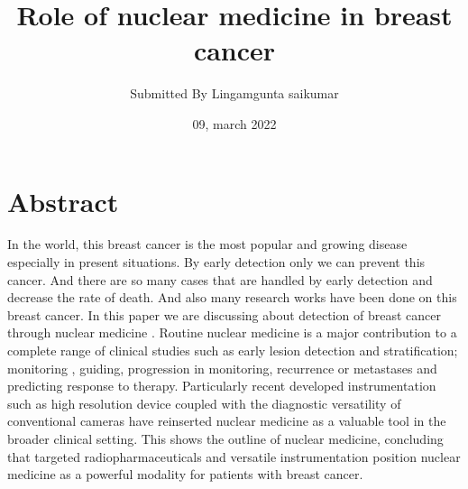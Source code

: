 \documentclass{article}
\title{Role of nuclear medicine in breast cancer}
\author{Submitted By Lingamgunta saikumar}
\date{09, march 2022}
\begin{document}
\maketitle
\section{Abstract}
In the world, this breast cancer is the most popular and growing disease especially in 
present situations. By early detection only we can prevent this cancer. And there are so 
many cases that are handled by early detection and decrease the rate of death. And also 
many research works have been done on this breast cancer. In this paper we are discussing 
about detection of breast cancer through nuclear medicine . Routine nuclear medicine is a 
major contribution to a complete range of clinical studies such as early lesion detection and 
stratification; monitoring , guiding, progression in monitoring, recurrence or metastases and 
predicting response to therapy. Particularly recent developed instrumentation such as highresolution device coupled with the diagnostic versatility of conventional cameras have 
reinserted nuclear medicine as a valuable tool in the broader clinical setting. This shows the 
outline of nuclear medicine, concluding that targeted radiopharmaceuticals and versatile 
instrumentation position nuclear medicine as a powerful modality for patients with breast 
cancer.
\end{document}
